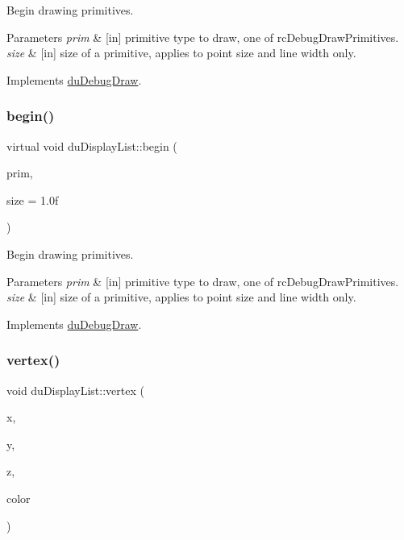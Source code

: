 Begin drawing primitives. 
\begin{DoxyParams}{Parameters}
{\em prim} & \mbox{[}in\mbox{]} primitive type to draw, one of rc\+Debug\+Draw\+Primitives. \\
\hline
{\em size} & \mbox{[}in\mbox{]} size of a primitive, applies to point size and line width only. \\
\hline
\end{DoxyParams}


Implements \hyperlink{structduDebugDraw_a6403932173f27503e05cd258f5837d17}{du\+Debug\+Draw}.

\mbox{\label{classduDisplayList_af71c472060ddabb596471dce5eb3e95f}} 
\subsubsection{\texorpdfstring{begin()}{begin()}\hspace{0.1cm}{\footnotesize\ttfamily [2/2]}}
{\footnotesize\ttfamily virtual void du\+Display\+List\+::begin (\begin{DoxyParamCaption}\item[{du\+Debug\+Draw\+Primitives}]{prim,  }\item[{float}]{size = {\ttfamily 1.0f} }\end{DoxyParamCaption})\hspace{0.3cm}{\ttfamily [virtual]}}

Begin drawing primitives. 
\begin{DoxyParams}{Parameters}
{\em prim} & \mbox{[}in\mbox{]} primitive type to draw, one of rc\+Debug\+Draw\+Primitives. \\
\hline
{\em size} & \mbox{[}in\mbox{]} size of a primitive, applies to point size and line width only. \\
\hline
\end{DoxyParams}


Implements \hyperlink{structduDebugDraw_a6403932173f27503e05cd258f5837d17}{du\+Debug\+Draw}.

\mbox{\label{classduDisplayList_af724f7566b2c1c2c09453dc064c6eecf}} 
\subsubsection{\texorpdfstring{vertex()}{vertex()}\hspace{0.1cm}{\footnotesize\ttfamily [1/4]}}
{\footnotesize\ttfamily void du\+Display\+List\+::vertex (\begin{DoxyParamCaption}\item[{const float}]{x,  }\item[{const float}]{y,  }\item[{const float}]{z,  }\item[{unsigned int}]{color }\end{DoxyParamCaption})\hspace{0.3cm}{\ttfamily [virtual]}}

